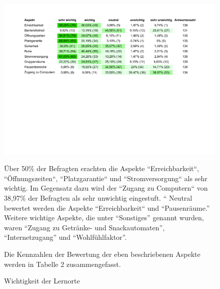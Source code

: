 \documentclass[11pt, a4paper]{article}
\begin{document}
\begin{figure}[htbp]
	\vspace*{6.2cm}
	\hspace*{-1.95cm}
	\includegraphics[scale = 0.746, trim=0.5cm 11cm 0.5cm 11cm]{Tabellen.pdf}
		\vspace{0.2cm}
	\caption{Wichtigkeit der Lernorte}
	\vspace{0.5cm}
   Über 50\% der Befragten erachten die Aspekte “Erreichbarkeit“, “Öffnungszeiten“, “Platzgarantie“ und “Stromversorgung“ als sehr wichtig. Im Gegensatz dazu wird der “Zugang zu Computern“ von 38,97\% der Befragten als sehr unwichtig eingestuft. “ Neutral bewertet werden die Aspekte “Erreichbarkeit“ und “Pausenräume.”
   Weitere wichtige Aspekte, die unter “Sonstiges” genannt wurden, waren “Zugang zu Getränke- und Snackautomaten”, “Internetzugang” und “Wohlfühlfaktor”.

   
	Die Kennzahlen der Bewertung der eben beschriebenen Aspekte werden in Tabelle 2 zusammengefasst.
\end{figure}
\end{document}
